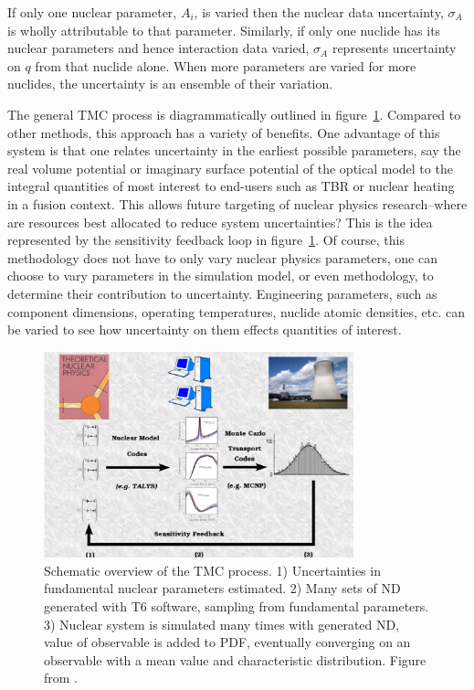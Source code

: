 If only one nuclear parameter, $A_{i}$, is varied then the nuclear data uncertainty, $\sigma_{A}$ is wholly attributable to that parameter. Similarly, if only one nuclide has its nuclear parameters and hence interaction data varied, $\sigma_{A}$ represents uncertainty on $q$ from that nuclide alone. When more parameters are varied for more nuclides, the uncertainty is an ensemble of their variation. 


The general TMC process is diagrammatically outlined in figure~\ref{fig:tmc_overview}. Compared to other methods, this approach has a variety of benefits. One advantage of this system is that one relates uncertainty in the earliest possible parameters, say the real volume potential or imaginary surface potential of the optical model to the integral quantities of most interest to end-users such as TBR or nuclear heating in a fusion context. This allows future targeting of nuclear physics research--where are resources best allocated to reduce system uncertainties? This is the idea represented by the sensitivity feedback loop in figure~\ref{fig:tmc_overview}. Of course, this methodology does not have to only vary nuclear physics parameters, one can choose to vary parameters in the simulation model, or even methodology, to determine their contribution to uncertainty. Engineering parameters, such as component dimensions, operating temperatures, nuclide atomic densities, etc. can be varied to see how uncertainty on them effects quantities of interest.

\begin{figure}
  \centering
  \includegraphics[width=0.8\textwidth]{tmc_overview.png}
  \caption{Schematic overview of the TMC process. 1) Uncertainties in fundamental nuclear parameters estimated. 2) Many sets of ND generated with T6 software, sampling from fundamental parameters. 3) Nuclear system is simulated many times with generated ND, value of observable is added to PDF, eventually converging on an observable with a mean value and characteristic distribution. Figure from \cite{Koning2008}.}
  \label{fig:tmc_overview}
\end{figure}

